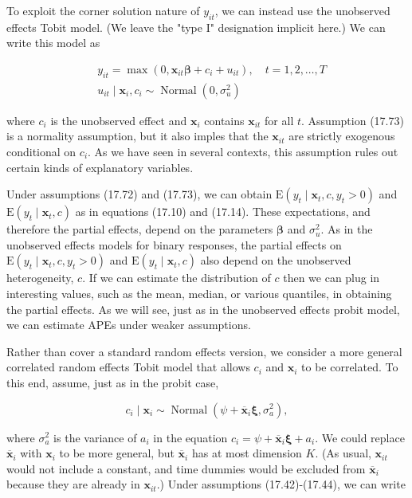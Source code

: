 \documentclass[10pt]{article}
\begin{document}
To exploit the corner solution nature of $y_{i t}$, we can instead use the unobserved effects Tobit model. (We leave the "type I" designation implicit here.) We can write this model as


\begin{align*}
& y_{i t}=\max \left(0, \mathbf{x}_{i t} \boldsymbol{\beta}+c_{i}+u_{i t}\right), \quad t=1,2, \ldots, T  \tag{17.72}\\
& u_{i t} \mid \mathbf{x}_{i}, c_{i} \sim \operatorname{Normal}\left(0, \sigma_{u}^{2}\right) \tag{17.73}
\end{align*}


where $c_{i}$ is the unobserved effect and $\mathbf{x}_{i}$ contains $\mathbf{x}_{i t}$ for all $t$. Assumption (17.73) is a normality assumption, but it also imples that the $\mathbf{x}_{i t}$ are strictly exogenous conditional on $c_{i}$. As we have seen in several contexts, this assumption rules out certain kinds of explanatory variables.

Under assumptions (17.72) and (17.73), we can obtain $\mathrm{E}\left(y_{t} \mid \mathbf{x}_{t}, c, y_{t}>0\right)$ and $\mathrm{E}\left(y_{t} \mid \mathbf{x}_{t}, c\right)$ as in equations (17.10) and (17.14). These expectations, and therefore the partial effects, depend on the parameters $\boldsymbol{\beta}$ and $\sigma_{u}^{2}$. As in the unobserved effects models for binary responses, the partial effects on $\mathrm{E}\left(y_{t} \mid \mathbf{x}_{t}, c, y_{t}>0\right)$ and $\mathrm{E}\left(y_{t} \mid \mathbf{x}_{t}, c\right)$ also depend on the unobserved heterogeneity, $c$. If we can estimate the distribution of $c$ then we can plug in interesting values, such as the mean, median, or various quantiles, in obtaining the partial effects. As we will see, just as in the unobserved effects probit model, we can estimate APEs under weaker assumptions.

Rather than cover a standard random effects version, we consider a more general correlated random effects Tobit model that allows $c_{i}$ and $\mathbf{x}_{i}$ to be correlated. To this end, assume, just as in the probit case,


\begin{equation*}
c_{i} \mid \mathbf{x}_{i} \sim \operatorname{Normal}\left(\psi+\overline{\mathbf{x}}_{i} \boldsymbol{\xi}, \sigma_{a}^{2}\right), \tag{17.74}
\end{equation*}


where $\sigma_{a}^{2}$ is the variance of $a_{i}$ in the equation $c_{i}=\psi+\overline{\mathbf{x}}_{i} \boldsymbol{\xi}+a_{i}$. We could replace $\overline{\mathbf{x}}_{i}$ with $\mathbf{x}_{i}$ to be more general, but $\overline{\mathbf{x}}_{i}$ has at most dimension $K$. (As usual, $\mathbf{x}_{i t}$ would not include a constant, and time dummies would be excluded from $\overline{\mathbf{x}}_{i}$ because they are already in $\mathbf{x}_{i t}$.) Under assumptions (17.42)-(17.44), we can write
\end{document}
